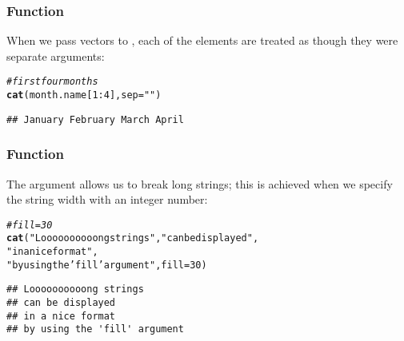 \documentclass[12pt]{beamer}\usepackage[]{graphicx}\usepackage[]{color}
\makeatletter
\newcommand{\hlnum}[1]{\textcolor[rgb]{0.686,0.059,0.569}{#1}}%
\newcommand{\hlstr}[1]{\textcolor[rgb]{0.192,0.494,0.8}{#1}}%
\newcommand{\hlcom}[1]{\textcolor[rgb]{0.678,0.584,0.686}{\textit{#1}}}%
\newcommand{\hlopt}[1]{\textcolor[rgb]{0,0,0}{#1}}%
\newcommand{\hlstd}[1]{\textcolor[rgb]{0.345,0.345,0.345}{#1}}%
\newcommand{\hlkwc}[1]{\textcolor[rgb]{0.333,0.667,0.333}{#1}}%
\newcommand{\hlkwd}[1]{\textcolor[rgb]{0.737,0.353,0.396}{\textbf{#1}}}%
\newenvironment{kframe}{%
 \def\at@end@of@kframe{}%
 \ifinner\ifhmode%
  \def\at@end@of@kframe{\end{minipage}}%
  \begin{minipage}{\columnwidth}%
 \fi\fi%
 \def\FrameCommand##1{\hskip\@totalleftmargin \hskip-\fboxsep
 \colorbox{shadecolor}{##1}\hskip-\fboxsep
     \hskip-\linewidth \hskip-\@totalleftmargin \hskip\columnwidth}%
 \MakeFramed {\advance\hsize-\width
   \@totalleftmargin\z@ \linewidth\hsize
   \@setminipage}}%
 {\par\unskip\endMakeFramed%
 \at@end@of@kframe}
\newenvironment{knitrout}{}{} %
\makeatother
\begin{document}

\begin{frame}[fragile]
\frametitle{Function }

When we pass vectors to , each of the elements are treated as though they were separate arguments:
\begin{knitrout}\footnotesize
{}\color{fgcolor}\begin{kframe}
\begin{alltt}
\hlcom{# first four months}
\hlkwd{cat}\hlstd{(month.name[}\hlnum{1}\hlopt{:}\hlnum{4}\hlstd{],} \hlkwc{sep} \hlstd{=} \hlstr{" "}\hlstd{)}
\end{alltt}
\begin{verbatim}
## January February March April
\end{verbatim}
\end{kframe}
\end{knitrout}

\end{frame}


\begin{frame}[fragile]
\frametitle{Function }

The argument  allows us to break long strings; this is achieved when we specify the string width with an integer number:
\begin{knitrout}\footnotesize
{}\color{fgcolor}\begin{kframe}
\begin{alltt}
\hlcom{# fill = 30}
\hlkwd{cat}\hlstd{(}\hlstr{"Loooooooooong strings"}\hlstd{,} \hlstr{"can be displayed"}\hlstd{,}
    \hlstr{"in a nice format"}\hlstd{,}
    \hlstr{"by using the 'fill' argument"}\hlstd{,} \hlkwc{fill} \hlstd{=} \hlnum{30}\hlstd{)}
\end{alltt}
\begin{verbatim}
## Loooooooooong strings 
## can be displayed 
## in a nice format 
## by using the 'fill' argument
\end{verbatim}
\end{kframe}
\end{knitrout}

\end{frame}

\end{document}

